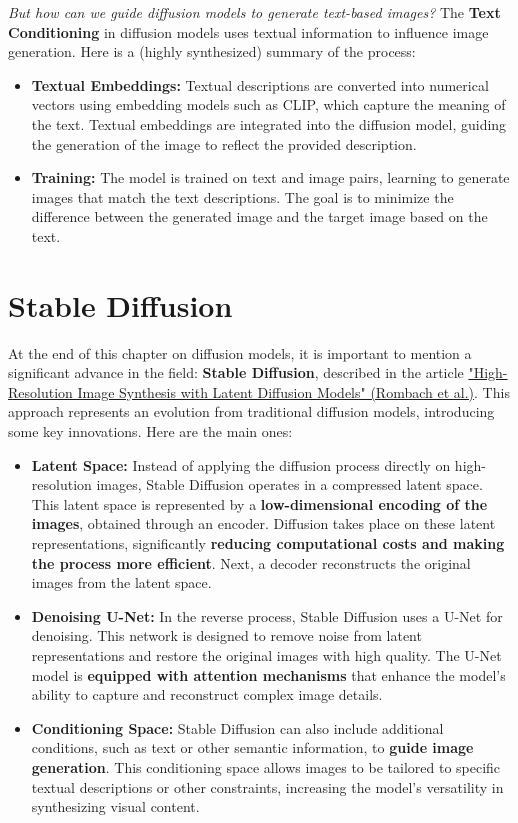 \textit{But how can we guide diffusion models to generate text-based images?} The \textbf{Text Conditioning} in diffusion models uses textual information to influence image generation. Here is a (highly synthesized) summary of the process:

\begin{itemize}
    \item \textbf{Textual Embeddings:} Textual descriptions are converted into numerical vectors using embedding models such as CLIP, which capture the meaning of the text. Textual embeddings are integrated into the diffusion model, guiding the generation of the image to reflect the provided description.
    
    \item \textbf{Training:} The model is trained on text and image pairs, learning to generate images that match the text descriptions. The goal is to minimize the difference between the generated image and the target image based on the text.
\end{itemize}

\section{Stable Diffusion}

At the end of this chapter on diffusion models, it is important to mention a significant advance in the field: \textbf{Stable Diffusion}, described in the article \href{https://arxiv.org/pdf/2112.10752}{"High-Resolution Image Synthesis with Latent Diffusion Models" (Rombach et al.)}. This approach represents an evolution from traditional diffusion models, introducing some key innovations. Here are the main ones:

\begin{itemize}
    \item \textbf{Latent Space:} Instead of applying the diffusion process directly on high-resolution images, Stable Diffusion operates in a compressed latent space. This latent space is represented by a \textbf{low-dimensional encoding of the images}, obtained through an encoder. Diffusion takes place on these latent representations, significantly \textbf{reducing computational costs and making the process more efficient}. Next, a decoder reconstructs the original images from the latent space.

    \item \textbf{Denoising U-Net:} In the reverse process, Stable Diffusion uses a U-Net for denoising. This network is designed to remove noise from latent representations and restore the original images with high quality. The U-Net model is \textbf{equipped with attention mechanisms} that enhance the model's ability to capture and reconstruct complex image details.

    \item \textbf{Conditioning Space:} Stable Diffusion can also include additional conditions, such as text or other semantic information, to \textbf{guide image generation}. This conditioning space allows images to be tailored to specific textual descriptions or other constraints, increasing the model's versatility in synthesizing visual content.
\end{itemize}

